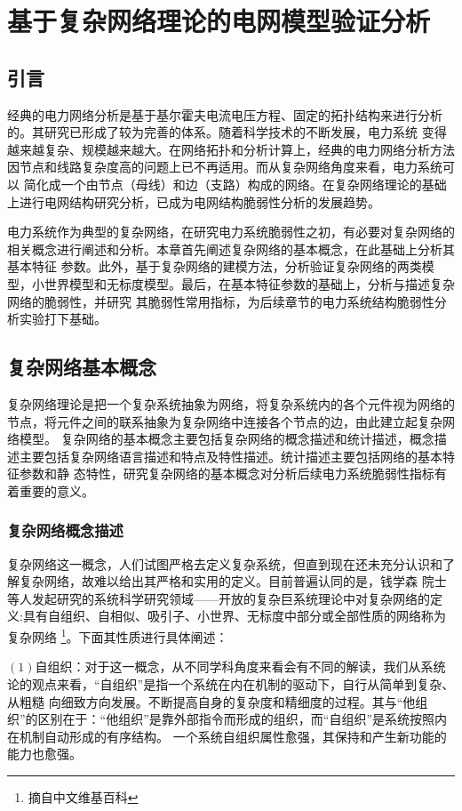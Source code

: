 \chapter{基于复杂网络理论的电网模型验证分析}
\label{cha:model}

\section{引言}
\label{sec:index2}
经典的电力网络分析是基于基尔霍夫电流电压方程、固定的拓扑结构来进行分析的。其研究已形成了较为完善的体系\cite{refs60}。随着科学技术的不断发展，电力系统
变得越来越复杂、规模越来越大。在网络拓扑和分析计算上，经典的电力网络分析方法因节点和线路复杂度高的问题上已不再适用。而从复杂网络角度来看，电力系统可以
简化成一个由节点（母线）和边（支路）构成的网络。在复杂网络理论的基础上进行电网结构研究分析，已成为电网结构脆弱性分析的发展趋势。

电力系统作为典型的复杂网络，在研究电力系统脆弱性之初，有必要对复杂网络的相关概念进行阐述和分析。本章首先阐述复杂网络的基本概念，在此基础上分析其基本特征
参数。此外，基于复杂网络的建模方法，分析验证复杂网络的两类模型，小世界模型和无标度模型。最后，在基本特征参数的基础上，分析与描述复杂网络的脆弱性，并研究
其脆弱性常用指标，为后续章节的电力系统结构脆弱性分析实验打下基础。

\section{复杂网络基本概念}
\label{sec:powersys}
复杂网络理论是把一个复杂系统抽象为网络，将复杂系统内的各个元件视为网络的节点，将元件之间的联系抽象为复杂网络中连接各个节点的边，由此建立起复杂网络模型。
复杂网络的基本概念主要包括复杂网络的概念描述和统计描述，概念描述主要包括复杂网络语言描述和特点及特性描述。统计描述主要包括网络的基本特征参数和静
态特性，研究复杂网络的基本概念对分析后续电力系统脆弱性指标有着重要的意义。

\subsection{复杂网络概念描述}
\label{sec:composite}
复杂网络这一概念，人们试图严格去定义复杂系统，但直到现在还未充分认识和了解复杂网络，故难以给出其严格和实用的定义\cite{refs61}。目前普遍认同的是，钱学森
院士等人发起研究的系统科学研究领域——开放的复杂巨系统理论中对复杂网络的定义:具有自组织、自相似、吸引子、小世界、无标度中部分或全部性质的网络称为复杂网络
\footnote{摘自中文维基百科}。下面其性质进行具体阐述：

$(1)$自组织：对于这一概念，从不同学科角度来看会有不同的解读，我们从系统论的观点来看，“自组织”是指一个系统在内在机制的驱动下，自行从简单到复杂、从粗糙
向细致方向发展。不断提高自身的复杂度和精细度的过程。其与“他组织”的区别在于：“他组织”是靠外部指令而形成的组织，而“自组织”是系统按照内在机制自动形成的有序结构。
一个系统自组织属性愈强，其保持和产生新功能的能力也愈强。

